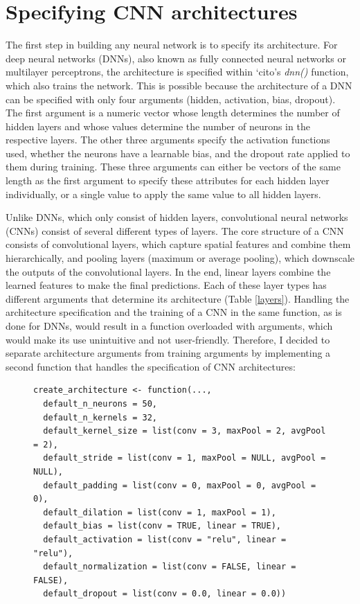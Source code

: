 \documentclass[12pt,twoside]{scrreport}
\newcommand{\pkg}[1]{`#1'}
\newcommand{\fn}[2][]{\textit{#2(}#1\textit{)}}
\begin{document}
\section*{Specifying CNN architectures}
The first step in building any neural network is to specify its architecture. For deep neural networks (DNNs), also known as fully connected neural networks or multilayer perceptrons, the architecture is specified within \pkg{cito}s \fn{dnn} function, which also trains the network. This is possible because the architecture of a DNN can be specified with only four arguments (hidden, activation, bias, dropout). The first argument is a numeric vector whose length determines the number of hidden layers and whose values determine the number of neurons in the respective layers. The other three arguments specify the activation functions used, whether the neurons have a learnable bias, and the dropout rate applied to them during training. These three arguments can either be vectors of the same length as the first argument to specify these attributes for each hidden layer individually, or a single value to apply the same value to all hidden layers.

Unlike DNNs, which only consist of hidden layers, convolutional neural networks (CNNs) consist of several different types of layers. The core structure of a CNN consists of convolutional layers, which capture spatial features and combine them hierarchically, and pooling layers (maximum or average pooling), which downscale the outputs of the convolutional layers. In the end, linear layers combine the learned features to make the final predictions. Each of these layer types has different arguments that determine its architecture (Table \ref{layers}). Handling the architecture specification and the training of a CNN in the same function, as is done for DNNs, would result in a function overloaded with arguments, which would make its use unintuitive and not user-friendly. Therefore, I decided to separate architecture arguments from training arguments by implementing a second function that handles the specification of CNN architectures:

\begin{figure}[h]
	\centering
	\newsavebox{\lstbox} %
	\begin{lrbox}{\lstbox}
		\begin{lstlisting}
create_architecture <- function(...,
  default_n_neurons = 50,
  default_n_kernels = 32,
  default_kernel_size = list(conv = 3, maxPool = 2, avgPool = 2),
  default_stride = list(conv = 1, maxPool = NULL, avgPool = NULL),
  default_padding = list(conv = 0, maxPool = 0, avgPool = 0),
  default_dilation = list(conv = 1, maxPool = 1),
  default_bias = list(conv = TRUE, linear = TRUE),
  default_activation = list(conv = "relu", linear = "relu"),
  default_normalization = list(conv = FALSE, linear = FALSE),
  default_dropout = list(conv = 0.0, linear = 0.0))
		\end{lstlisting}
	\end{lrbox}
	\resizebox{\textwidth}{!}{\usebox{\lstbox}}
\end{figure}
\end{document}
